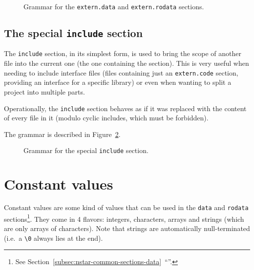 \begin{figure}[htb]
	\centering


	\caption{Grammar for the \texttt{extern.data} and \texttt{extern.rodata} sections.}
	\label{fig:nstar-common-sections-extern-data-grammar}
\end{figure}

\subsection{The special \texttt{include} section}\label{subsec:nstar-common-sections-include}

The \texttt{include} section, in its simplest form, is used to bring the scope of another file into the current one (the one containing the section).
This is very useful when needing to include interface files (files containing just an \texttt{extern.code} section, providing an interface for a specific library) or even when wanting to split a project into multiple parts.

Operationally, the \texttt{include} section behaves as if it was replaced with the content of every file in it (modulo cyclic includes, which must be forbidden).

The grammar is described in Figure~\ref{fig:nstar-common-sections-include-grammar}.

\begin{figure}[htb]
	\centering


	\caption{Grammar for the special \texttt{include} section.}
	\label{fig:nstar-common-sections-include-grammar}
\end{figure}

\section{Constant values}\label{sec:nstar-common-constvalue}

Constant values are some kind of values that can be used in the \texttt{data} and \texttt{rodata} sections\footnote{See Section~\ref{subsec:nstar-common-sections-data}~``''.}.
They come in 4 flavors: integers, characters, arrays and strings (which are only arrays of characters).
Note that strings are automatically null-terminated (i.e.\ a \texttt{\textbackslash 0} always lies at the end).

